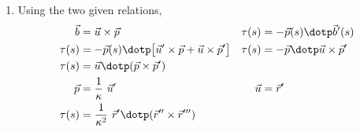 \begin{enumerate}
    \item Using the two given relations,
          \begin{align}
              \vec{b}                         & = \vec{u} \times \vec{p}        &
              \tau(s)                         & = -\vec{p}(s) \dotp \vec{b}'(s)   \\
              \tau(s)                         & = -\vec{p}(s) \dotp
              \big[ \vec{u}' \times \vec{p}
              + \vec{u} \times \vec{p}' \big] &
              \tau(s)                         & = -\vec{p} \dotp \vec{u}
              \times \vec{p}'                                                     \\
              \tau(s)                         & = \vec{u} \dotp (\vec{p}
              \times \vec{p}')                                                    \\
              \vec{p}                         & = \frac{1}{\kappa}\ \vec{u}'    &
              \vec{u}                         & = \vec{r}'                        \\
              \tau(s)                         & = \frac{1}{\kappa^2}
              \ \vec{r}' \dotp (\vec{r}'' \times \vec{r}''')
          \end{align}


\end{enumerate}
